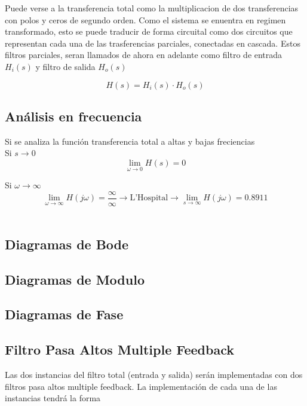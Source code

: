 \documentclass[10pt,a4paper]{article}
\begin{document}
    Puede verse a la transferencia total como la multiplicacion de dos transferencias con polos y ceros de segundo orden.
    Como el sistema se enuentra en regimen transformado, esto se puede traducir de forma circuital como dos circuitos que representan cada una de las trasferencias parciales, conectadas en cascada.
    Estos filtros parciales, seran llamados de ahora en adelante como filtro de entrada $H_i(s)$ y filtro de salida $H_o(s)$

    \[ H(s) = H_{i}(s) \cdot H_{o}(s)\]

    \subsection{Análisis en frecuencia}\label{subsec:análisis-en-frecuencia}
    Si se analiza la función transferencia total a altas y bajas freciencias \\

    Si $s \rightarrow 0$
    \[\lim_{\omega \rightarrow 0}{H(s)} = 0 \]

    Si $\omega \rightarrow \infty$
    \[\lim_{\omega \rightarrow \infty}{H(j\omega)} = \frac{\infty}{\infty} \rightarrow \mbox{L'Hospital} \rightarrow \lim_{s \rightarrow \infty}{H(j\omega)} = 0.8911\] \\

    \subsection{Diagramas de Bode}\label{subsec:diagramas-de-bode}

    \subsection{Diagramas de Modulo}\label{subsec:diagramas-de-modulo}

    \subsection{Diagramas de Fase}\label{subsec:diagramas-de-fase}

    \subsection{Filtro Pasa Altos Multiple Feedback}\label{subsec:filtro-pasa-altos-multiple-feedback}

    Las dos instancias del filtro total (entrada y salida) serán implementadas con dos filtros pasa altos multiple feedback.
    La implementación de cada una de las instancias tendrá la forma
\end{document}
